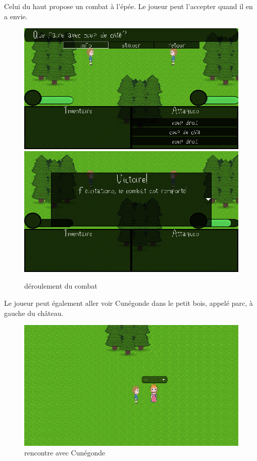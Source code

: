 \documentclass[11pt]{article}
\begin{document}
Celui du haut propose un combat à l'épée. Le joueur peut l'accepter quand il en a envie. 

\begin{figure}[H]
\includegraphics[scale=0.35]{gameplay6}
\includegraphics[scale=0.35]{gameplay7}
\centering
\caption{déroulement du combat}
\end{figure}

Le joueur peut également aller voir Cunégonde dans le petit bois, appelé parc, à gauche du château.

\begin{figure}[H]
\includegraphics[scale=0.35]{gameplay8}
\centering
\caption{rencontre avec Cunégonde}
\end{figure}
\end{document}
